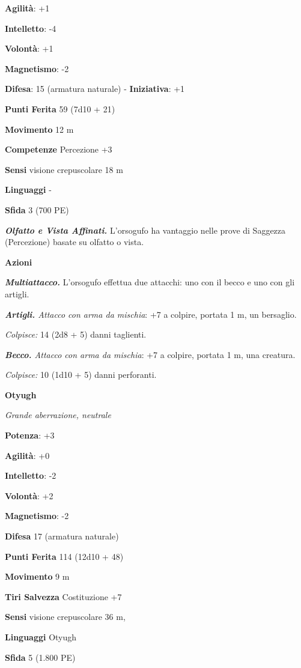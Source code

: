 \begin{multicols}{2}
\textbf{Agilità}: +1

\textbf{Intelletto}: -4

\textbf{Volontà}: +1

\textbf{Magnetismo}: -2

\textbf{Difesa}: 15 (armatura naturale) - \textbf{Iniziativa}: +1

\textbf{Punti Ferita} 59 (7d10 + 21)

\textbf{Movimento} 12 m

\textbf{Competenze} Percezione +3

\textbf{Sensi} visione crepuscolare 18 m

\textbf{Linguaggi} -

\textbf{Sfida} 3 (700 PE)\smallskip

\emph{\textbf{Olfatto e Vista Affinati.}} L'orsogufo ha vantaggio nelle
prove di Saggezza (Percezione) basate su olfatto o vista.

\smallskip\textbf{Azioni}

\emph{\textbf{Multiattacco.}} L'orsogufo effettua due attacchi: uno con
il becco e uno con gli artigli.

\emph{\textbf{Artigli.} Attacco con arma da mischia}: +7 a colpire,
portata 1 m, un bersaglio.

\emph{Colpisce:} 14 (2d8 + 5) danni taglienti.

\emph{\textbf{Becco.} Attacco con arma da mischia}: +7 a colpire,
portata 1 m, una creatura.

\emph{Colpisce:} 10 (1d10 + 5) danni perforanti.


\textbf{Otyugh}

\emph{Grande aberrazione, neutrale}

\textbf{Potenza}: +3

\textbf{Agilità}: +0

\textbf{Intelletto}: -2

\textbf{Volontà}: +2

\textbf{Magnetismo}: -2

\textbf{Difesa} 17 (armatura naturale)

\textbf{Punti Ferita} 114 (12d10 + 48)

\textbf{Movimento} 9 m

\textbf{Tiri Salvezza} Costituzione +7

\textbf{Sensi} visione crepuscolare 36 m, 

\textbf{Linguaggi} Otyugh

\textbf{Sfida} 5 (1.800 PE)\smallskip


\end{multicols}
